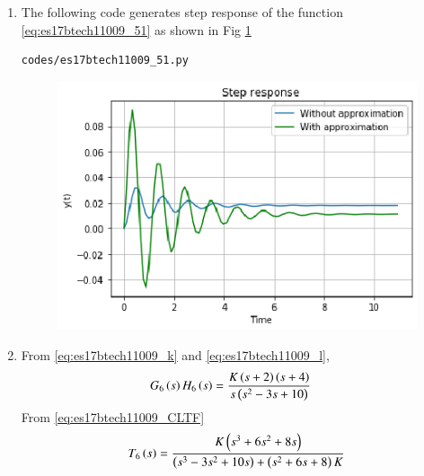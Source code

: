 \begin{enumerate}[label=\thesection.\arabic*.,ref=\thesection.\theenumi]
 \item
The following code generates step response of the function \eqref{eq:es17btech11009_51} as shown in Fig \ref{fig:es17btech11009_fig51}
\begin{lstlisting}
codes/es17btech11009_51.py
\end{lstlisting}
\begin{figure}[!h]
\centering
\includegraphics[width=\columnwidth]{./figs/es17btech11009_51.eps}
\caption{}
\label{fig:es17btech11009_fig51}
\end{figure}

\item
From \eqref{eq:es17btech11009_k} and \eqref{eq:es17btech11009_l},
\begin{align}
G_{6}\brak{s}H_{6}\brak{s}&= \frac{K\brak{s+2}\brak{s+4}}{s\brak{s^2 - 3s +10}}
\label{eq:es17btech11009_ff}
\end{align}
\solution
From \eqref{eq:es17btech11009_CLTF}
\begin{align}
T_{6}\brak{s} = \frac{K\brak{s^3 + 6s^2+8s}}{\brak{s^3 - 3s^2 + 10s }+\brak{s^2 +6s +8} K}
\label{eq:es17btech11009_61}
 \end{align}


\end{enumerate}
